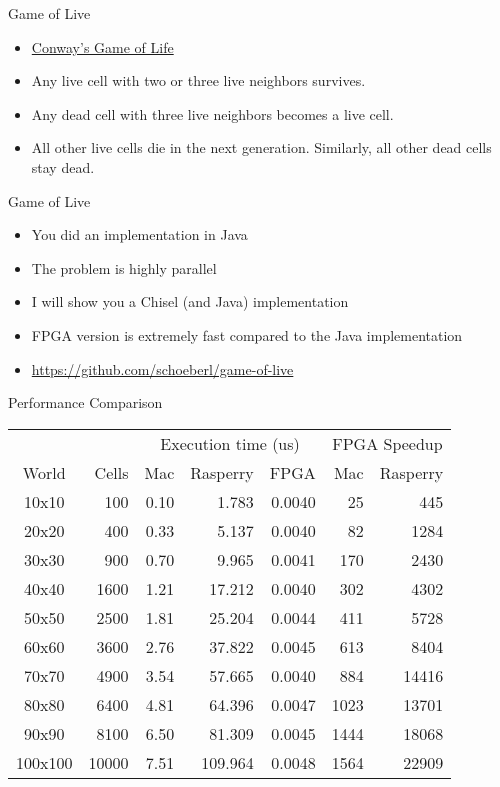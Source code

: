 \begin{frame}[fragile]{Game of Live}
\begin{itemize}
\item \href{https://en.wikipedia.org/wiki/Conway\%27s_Game_of_Life}{Conway's Game of Life}
\item Any live cell with two or three live neighbors survives. 
\item Any dead cell with three live neighbors becomes a live cell.
\item All other live cells die in the next generation. Similarly, all other dead cells stay dead.
\end{itemize}
\end{frame}

\begin{frame}[fragile]{Game of Live}
\begin{itemize}
\item You did an implementation in Java
\item The problem is highly parallel
\item I will show you a Chisel (and Java) implementation
\item FPGA version is extremely fast compared to the Java implementation
\item \url{https://github.com/schoeberl/game-of-live}
\end{itemize}
\end{frame}

\begin{frame}[fragile]{Performance Comparison}
\begin{table}
  \centering
\begin{tabular}{crrrrrr}
    \toprule
    & &\multicolumn{3}{c}{Execution time (us)} & \multicolumn{2}{c}{FPGA Speedup}\\
World & Cells&Mac&Rasperry&FPGA& Mac& Rasperry\\
\midrule
10x10 & 100&0.10&1.783&0.0040&25&445\\
20x20 & 400&0.33&5.137&0.0040&82&1284\\
30x30 & 900&0.70&9.965&0.0041&170&2430\\
40x40 & 1600&1.21&17.212&0.0040&302&4302\\
50x50 & 2500&1.81&25.204&0.0044&411&5728\\
60x60 & 3600&2.76&37.822&0.0045&613&8404\\
70x70 & 4900&3.54&57.665&0.0040&884&14416\\
80x80 & 6400&4.81&64.396&0.0047&1023&13701\\
90x90 & 8100&6.50&81.309&0.0045&1444&18068\\
100x100 & 10000&7.51&109.964&0.0048&1564&22909\\
\bottomrule
\end{tabular}
    \label{tab:speedup}
\end{table}
\end{frame}

